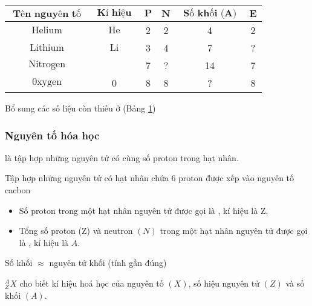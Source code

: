 \begin{longtable}{|c|c|c|c|c|c|}
	\caption{}
	\label{tab:table2}\\
	\hline 
	\rowcolor{\mauphu!25}$ \textbf { Tên nguyên tố } $ & $ \textbf { Kí hiệu } $ & $ \textbf{P} $ & $ \textbf{N} $ & $ \textbf { Số khối  (A) } $ & $ \textbf{E} $\\
	\hline 
	$ \text { Helium } $ & $ \text { He } $ & 2 & 2 & 4 & 2 \\
	\hline 
	$ \text { Lithium } $ & $ \text { Li } $ & 3 & 4 & 7 & ? \\
	\hline 
	$ \text { Nitrogen } $ & \text { N } & 7 & ? & 14 & 7 \\
	\hline
	$ \text { 0xygen }$ & 0 & 8 & 8 & ? & 8 \\
	\hline
\end{longtable}
\begin{hoivadap}
	Bổ sung các số liệu còn thiếu ở (Bảng \ref{tab:table2})
\end{hoivadap}
\subsubsection{Nguyên tố hóa học}
\begin{kngsnd}
	 là tập hợp những nguyên tử có cùng số proton trong hạt nhân.
\end{kngsnd}
Tập hợp những nguyên tử có hạt nhân chứa 6 proton được xếp vào nguyên tố cacbon
\begin{kngsnd}
	\begin{itemize}
	\item Số proton trong một hạt nhân nguyên tử được gọi là , kí hiệu là Z.
	\item Tổng số proton (Z) và neutron $(N)$ trong một hạt nhân nguyên tử được gọi là , kí hiệu là $A$.
	\end{itemize}
 \centering{}
\end{kngsnd}
\begin{note}
\end{note}
\begin{notegsnd}
Số khối	$  \approx  $ nguyên tử khối (tính gần đúng)
\end{notegsnd}
\begin{kngsnd}
	 ${ }_Z^A X$ cho biết kí hiệu hoá học của nguyên tố $(X)$, số hiệu nguyên tử $(Z)$ và số khối $(A)$.
\end{kngsnd}

